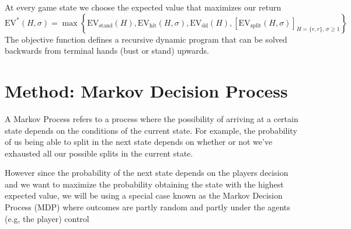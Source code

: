 \documentclass[12pt,a4paper]{cibb}
\begin{document}
At every game state we choose the expected value that maximizes our return
\begin{equation}
\mathrm{EV}^*(H, σ  ) =
\max \left\{
\mathrm{EV}_{\text{stand}}(H),
\mathrm{EV}_{\text{hit}}(H, σ  ),
\mathrm{EV}_{\text{dd}}(H),
\left[\mathrm{EV}_{\text{split}}(H, σ  )\right]_{H = \{r, r\},\, σ   \geq 1}
\right\}
\label{eq:OBJ_FUNCTION}
    \end{equation}
The objective function defines a recursive dynamic program that can be solved backwards from terminal hands (bust or stand) upwards. 

\section{Method: Markov Decision Process }
A Markov Process refers to a process where the possibility of arriving at a certain state depends on the conditions of the current state. For example, the probability of us being able to split in the next state depends on whether or not we've exhausted all our possible splits in the current state.

However since the probability of the next state depends on the players decision and we want to maximize the probability obtaining the state with the highest expected value, we will be using a special case known as the Markov Decision Process (MDP) where outcomes are partly random and partly under the agents (e.g, the player) control
\end{document}
